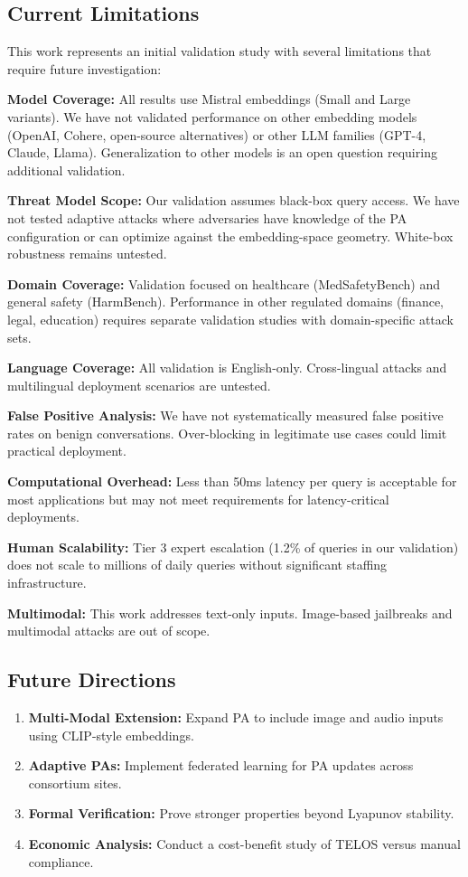 \documentclass[11pt,a4paper]{article}
\begin{document}
\subsection{Current Limitations}

This work represents an initial validation study with several limitations that require future investigation:

\textbf{Model Coverage:} All results use Mistral embeddings (Small and Large variants). We have not validated performance on other embedding models (OpenAI, Cohere, open-source alternatives) or other LLM families (GPT-4, Claude, Llama). Generalization to other models is an open question requiring additional validation.

\textbf{Threat Model Scope:} Our validation assumes black-box query access. We have not tested adaptive attacks where adversaries have knowledge of the PA configuration or can optimize against the embedding-space geometry. White-box robustness remains untested.

\textbf{Domain Coverage:} Validation focused on healthcare (MedSafetyBench) and general safety (HarmBench). Performance in other regulated domains (finance, legal, education) requires separate validation studies with domain-specific attack sets.

\textbf{Language Coverage:} All validation is English-only. Cross-lingual attacks and multilingual deployment scenarios are untested.

\textbf{False Positive Analysis:} We have not systematically measured false positive rates on benign conversations. Over-blocking in legitimate use cases could limit practical deployment.

\textbf{Computational Overhead:} Less than 50ms latency per query is acceptable for most applications but may not meet requirements for latency-critical deployments.

\textbf{Human Scalability:} Tier 3 expert escalation (1.2\% of queries in our validation) does not scale to millions of daily queries without significant staffing infrastructure.

\textbf{Multimodal:} This work addresses text-only inputs. Image-based jailbreaks and multimodal attacks are out of scope.

\subsection{Future Directions}

\begin{enumerate}
\item \textbf{Multi-Modal Extension:} Expand PA to include image and audio inputs using CLIP-style embeddings.
\item \textbf{Adaptive PAs:} Implement federated learning for PA updates across consortium sites.
\item \textbf{Formal Verification:} Prove stronger properties beyond Lyapunov stability.
\item \textbf{Economic Analysis:} Conduct a cost-benefit study of TELOS versus manual compliance.
\end{enumerate}
\end{document}
